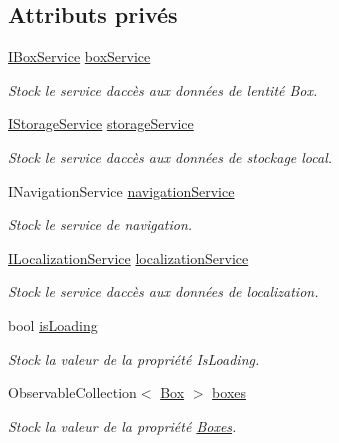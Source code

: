 \subsection*{Attributs privés}
\begin{DoxyCompactItemize}
\item 
\hyperlink{interface_boxes_1_1_services_1_1_box_1_1_i_box_service}{I\+Box\+Service} \hyperlink{class_boxes_1_1_view_models_1_1_my_boxes_view_model_ab3f024f0941c1630bd3f9cbf0bd6dce4}{box\+Service}
\begin{DoxyCompactList}\small\item\em Stock le service d\textquotesingle{}accès aux données de l\textquotesingle{}entité Box. \end{DoxyCompactList}\item 
\hyperlink{interface_boxes_1_1_services_1_1_storage_1_1_i_storage_service}{I\+Storage\+Service} \hyperlink{class_boxes_1_1_view_models_1_1_my_boxes_view_model_a37f8b8ffe5a745143ce38a96a56b2ec9}{storage\+Service}
\begin{DoxyCompactList}\small\item\em Stock le service d\textquotesingle{}accès aux données de stockage local. \end{DoxyCompactList}\item 
I\+Navigation\+Service \hyperlink{class_boxes_1_1_view_models_1_1_my_boxes_view_model_a2903b75047e0ab39b06061d9666572c8}{navigation\+Service}
\begin{DoxyCompactList}\small\item\em Stock le service de navigation. \end{DoxyCompactList}\item 
\hyperlink{interface_boxes_1_1_services_1_1_localization_1_1_i_localization_service}{I\+Localization\+Service} \hyperlink{class_boxes_1_1_view_models_1_1_my_boxes_view_model_aaeb99d047d625e8bb77a00f0b0922b20}{localization\+Service}
\begin{DoxyCompactList}\small\item\em Stock le service d\textquotesingle{}accès aux données de localization. \end{DoxyCompactList}\item 
bool \hyperlink{class_boxes_1_1_view_models_1_1_my_boxes_view_model_a3b5e809b4f208c572dc598e14b5f4581}{is\+Loading}
\begin{DoxyCompactList}\small\item\em Stock la valeur de la propriété {\ttfamily Is\+Loading}. \end{DoxyCompactList}\item 
Observable\+Collection$<$ \hyperlink{class_boxes_1_1_models_1_1_box}{Box} $>$ \hyperlink{class_boxes_1_1_view_models_1_1_my_boxes_view_model_a72c2f35d46df30a2a514313dbb7c8e7f}{boxes}
\begin{DoxyCompactList}\small\item\em Stock la valeur de la propriété {\ttfamily \hyperlink{namespace_boxes}{Boxes}}. \end{DoxyCompactList}\end{DoxyCompactItemize}


